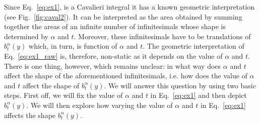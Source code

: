 \documentclass{article}
\theoremstyle{theorem}
\theoremstyle{definition}
\begin{document}
\noindent
Since Eq.~\ref{eq:ex1}, is a Cavalieri integral it has a known geometric interpretation (see Fig.~\ref{fig:caval2}). It can be interpreted as the area obtained by summing together the areas of an infinite 
number of infinitesimals whose shape is determined by $\alpha$ and $t$. Moreover, these infinitesimals have to be translations of $b_t^{\alpha}(y)$ which, in turn, is 
function of $\alpha$ and $t$. The geometric interpretation of Eq.~\eqref{eq:ex1_raw} is, therefore, non-static as it depends on the value of $\alpha$ and $t$. 
There is one thing, however, which remains unclear: in what way does $\alpha$ and $t$ affect the shape of the aforementioned infinitesimals, i.e. how does the value of $\alpha$ and $t$ affect the shape of $b_t^{\alpha}(y)$. 
We will answer this question by using two basic steps. First off, we will fix the value of $\alpha$ and $t$ in Eq.~\eqref{eq:ex1} and then depict $b_t^{\alpha}(y)$. We will then explore how varying the value of $\alpha$ and $t$ in Eq.~\eqref{eq:ex1} affects the shape $b_t^{\alpha}(y)$.\\

\end{document}
